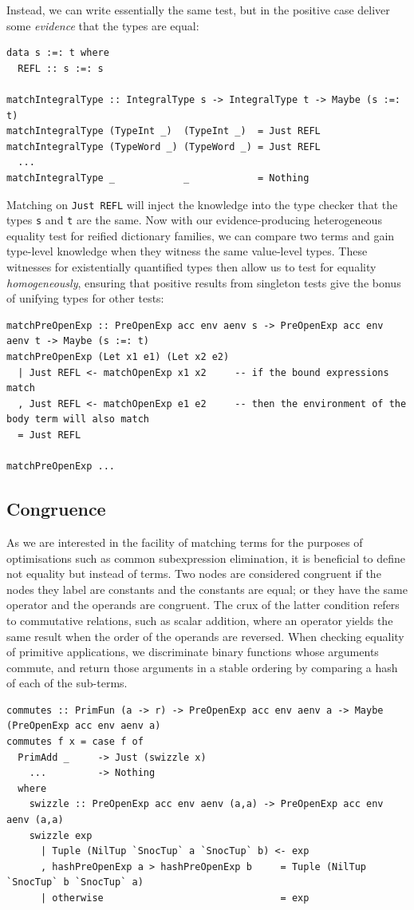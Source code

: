 Instead, we can write essentially the same test, but in the positive case
deliver some \emph{evidence} that the types are equal:
%
\begin{lstlisting}[style=haskell]
data s :=: t where
  REFL :: s :=: s

matchIntegralType :: IntegralType s -> IntegralType t -> Maybe (s :=: t)
matchIntegralType (TypeInt _)  (TypeInt _)  = Just REFL
matchIntegralType (TypeWord _) (TypeWord _) = Just REFL
  ...
matchIntegralType _            _            = Nothing
\end{lstlisting}
%
Matching on \lstinline{Just REFL} will inject the knowledge into the type
checker that the types \texttt{s} and \texttt{t} are the same. Now with our
evidence-producing heterogeneous equality test for reified dictionary families,
we can compare two terms and gain type-level knowledge when they witness the
same value-level types. These witnesses for existentially quantified types then
allow us to test for equality \emph{homogeneously}, ensuring that positive
results from singleton tests give the bonus of unifying types for other tests:
%
\begin{lstlisting}[style=haskell]
matchPreOpenExp :: PreOpenExp acc env aenv s -> PreOpenExp acc env aenv t -> Maybe (s :=: t)
matchPreOpenExp (Let x1 e1) (Let x2 e2)
  | Just REFL <- matchOpenExp x1 x2     -- if the bound expressions match
  , Just REFL <- matchOpenExp e1 e2     -- then the environment of the body term will also match
  = Just REFL

matchPreOpenExp ...
\end{lstlisting}


\subsection{Congruence}

As we are interested in the facility of matching terms for the purposes of
optimisations such as common subexpression elimination, it is beneficial to
define not equality but instead  of terms. Two nodes are
considered congruent if the nodes they label are constants and the constants are
equal; or they have the same operator and the operands are congruent. The crux
of the latter condition refers to commutative relations, such as scalar
addition, where an operator yields the same result when the order of the
operands are reversed. When checking equality of primitive applications, we
discriminate binary functions whose arguments commute, and return those
arguments in a stable ordering by comparing a hash of each of the
sub-terms.
%
\begin{lstlisting}[style=haskell]
commutes :: PrimFun (a -> r) -> PreOpenExp acc env aenv a -> Maybe (PreOpenExp acc env aenv a)
commutes f x = case f of
  PrimAdd _     -> Just (swizzle x)
    ...         -> Nothing
  where
    swizzle :: PreOpenExp acc env aenv (a,a) -> PreOpenExp acc env aenv (a,a)
    swizzle exp
      | Tuple (NilTup `SnocTup` a `SnocTup` b) <- exp
      , hashPreOpenExp a > hashPreOpenExp b     = Tuple (NilTup `SnocTup` b `SnocTup` a)
      | otherwise                               = exp
\end{lstlisting}


